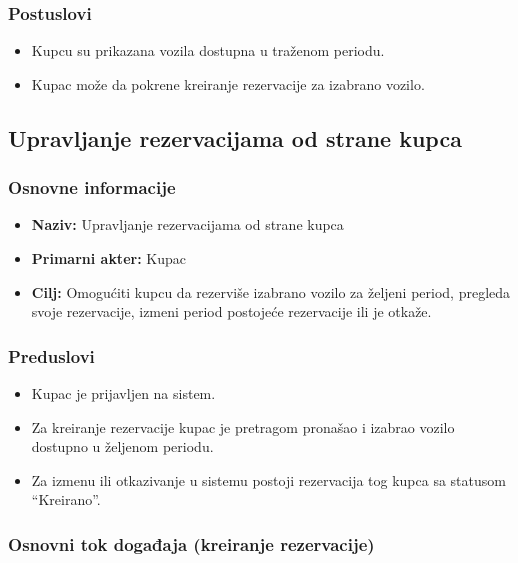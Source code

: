 \documentclass[a4paper,12pt]{article}
\begin{document}
\subsubsection{Postuslovi}

\begin{itemize}
    \item Kupcu su prikazana vozila dostupna u traženom periodu.
    \item Kupac može da pokrene kreiranje rezervacije za izabrano vozilo.
\end{itemize}

\newpage

\subsection{Upravljanje rezervacijama od strane kupca}

\subsubsection{Osnovne informacije}

\begin{itemize}
    \item \textbf{Naziv:} Upravljanje rezervacijama od strane kupca
    \item \textbf{Primarni akter:} Kupac
    \item \textbf{Cilj:} Omogućiti kupcu da rezerviše izabrano vozilo za željeni period, pregleda svoje rezervacije, izmeni period postojeće rezervacije ili je otkaže.
\end{itemize}

\subsubsection{Preduslovi}

\begin{itemize}
    \item Kupac je prijavljen na sistem.
    \item Za kreiranje rezervacije kupac je pretragom pronašao i izabrao vozilo dostupno u željenom periodu.
    \item Za izmenu ili otkazivanje u sistemu postoji rezervacija tog kupca sa statusom \enquote{Kreirano}.
\end{itemize}

\subsubsection{Osnovni tok događaja (kreiranje rezervacije)}
\end{document}
